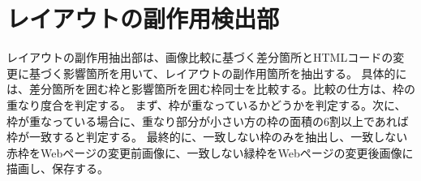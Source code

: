 \section{レイアウトの副作用検出部}\label{sec:Layout_subEffect_extraction_section}
レイアウトの副作用抽出部は、画像比較に基づく差分箇所とHTMLコードの変更に基づく影響箇所を用いて、レイアウトの副作用箇所を抽出する。
具体的には、差分箇所を囲む枠と影響箇所を囲む枠同士を比較する。比較の仕方は、枠の重なり度合を判定する。
まず、枠が重なっているかどうかを判定する。次に、枠が重なっている場合に、重なり部分が小さい方の枠の面積の6割以上であれば枠が一致すると判定する。
最終的に、一致しない枠のみを抽出し、一致しない赤枠をWebページの変更前画像に、一致しない緑枠をWebページの変更後画像に描画し、保存する。

